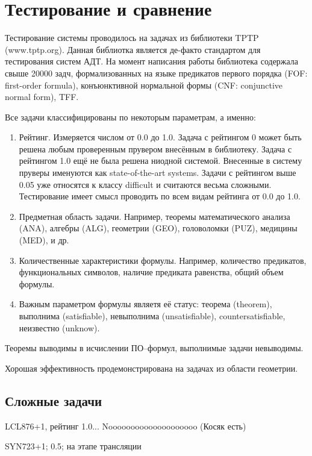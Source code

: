\section{Тестирование и сравнение}

Тестирование системы проводилось на задачах из библиотеки TPTP (www.tptp.org). Данная библиотка является де-факто стандартом для тестирования систем АДТ. На момент написания работы библиотека содержала свыше 20000 задч, формализованных на языке предикатов первого порядка (FOF: first-order formula), конъюнктивной нормальной формы (CNF: conjunctive normal form), TFF.

Все задачи классифицированы по некоторым параметрам, а именно:
\begin{enumerate}
\item Рейтинг. Измеряется числом от 0.0 до 1.0. Задача с рейтингом 0 может быть решена любым проверенным прувером внесённым в библиотеку. Задача с рейтингом 1.0 ещё не была решена ниодной системой. Внесенные в систему пруверы именуются как state-of-the-art systems. Задачи с рейтингом выше 0.05 уже относятся к классу difficult и считаются весьма сложными. Тестирование имеет смысл проводить по всем видам рейтинга от 0.0 до 1.0.
\item Предметная область задачи. Например, теоремы математического анализа (ANA), алгебры (ALG), геометрии (GEO), головоломки (PUZ), медицины (MED), и др.
\item Количественные характеристики формулы. Например, количество предикатов, функциональных символов, наличие предиката равенства, общий объем формулы.
\item Важным параметром формулы являетя её статус: теорема (theorem), выполнима (satisfiable), невыполнима (unsatisfiable), countersatisfiable, неизвестно (unknow).
\end{enumerate}

Теоремы выводимы в исчислении ПО--формул, выполнимые задачи невыводимы.

Хорошая эффективность продемонстрирована на задачах из области геометрии. 



\subsection{Сложные задачи}
LCL876+1, рейтинг 1.0... Noooooooooooooooooooo (Косяк есть)

SYN723+1; 0.5; на этапе трансляции

